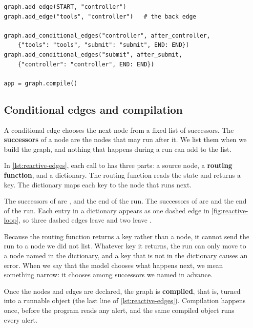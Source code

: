 \begin{lstlisting}[basicstyle=\ttfamily\footnotesize, caption={Illustrative code that declares the edges of the reactive loop and compiles the graph.}, label=lst:reactive-edges]
graph.add_edge(START, "controller")
graph.add_edge("tools", "controller")   # the back edge

graph.add_conditional_edges("controller", after_controller,
    {"tools": "tools", "submit": "submit", END: END})
graph.add_conditional_edges("submit", after_submit,
    {"controller": "controller", END: END})

app = graph.compile()
\end{lstlisting}

\subsection{Conditional edges and compilation}
\label{sec:reactive-code}

A conditional edge chooses the next node from a fixed list of successors. The \textbf{successors} of
a node are the nodes that may run after it. We list them when we build the graph, and nothing that
happens during a run can add to the list.

In \cref{lst:reactive-edges}, each call to  has three parts: a
source node, a \textbf{routing function}, and a dictionary. The routing function reads the state and
returns a key. The dictionary maps each key to the node that runs next.

The successors of  are ,  and the end of the run.
The successors of  are  and the end of the run. Each entry in a
dictionary appears as one dashed edge in \cref{fig:reactive-loop}, so three dashed edges leave
 and two leave .

Because the routing function returns a key rather than a node, it cannot send the run to a node we
did not list. Whatever key it returns, the run can only move to a node named in the dictionary, and
a key that is not in the dictionary causes an error. When we say that the model chooses what happens
next, we mean something narrow: it chooses among successors we named in advance.

Once the nodes and edges are declared, the graph is \textbf{compiled}, that is, turned into a
runnable object (the last line of \cref{lst:reactive-edges}). Compilation happens once, before the
program reads any alert, and the same compiled object runs every alert.

